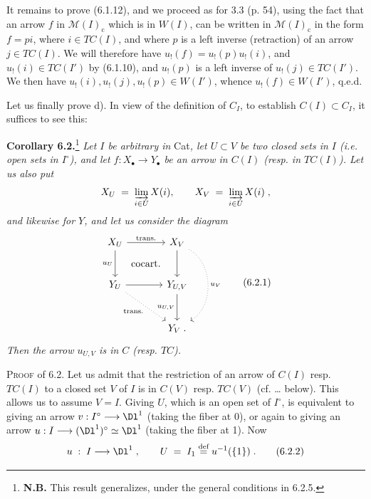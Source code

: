 

It remains to prove (6.1.12), and we proceed as for 3.3 (p. 54), using the fact that an arrow $f$ in $\mathcal{M}(I)_{\mathrm{c}}$ which is in $W(I)$, can be written in $\mathcal{M}(I)_{\mathrm{c}}$ in the form $f = pi$, where $i \in TC(I)$, and where $p$ is a left inverse (retraction) of an arrow $j \in TC(I)$. We will therefore have $u_!(f) = u_!(p)u_!(i)$, and $u_!(i) \in TC(I')$ by (6.1.10), and $u_!(p)$ is a left inverse of $u_!(j) \in TC(I')$. We then have $u_!(i), u_!(j), u_!(p) \in W(I')$, whence $u_!(f) \in W(I')$, q.e.d.

Let us finally prove d). In view of the definition of $C_I$, to establish $C(I) \subset C_I$, it suffices to see this:

\textbf{Corollary 6.2.}\footnote[31]{\textbf{N.B.} This result generalizes, under the general conditions in 6.2.5.} \textit{Let $I$ be arbitrary in} Cat\textit{, let $U \subset V$ be two closed sets in $I$ (i.e. open sets in $I^{\circ}$), and let $f : X_{\bullet} \longrightarrow Y_{\bullet}$ be an arrow in $C(I)$ (resp. in $TC(I)$). Let us also put}
\[
X_U \;=\; \varinjlim_{i\in U} X(i), \qquad X_V \;=\; \varinjlim_{i\in U} X(i)\;, %
\]
\textit{and likewise for $Y$, and let us consider the diagram}
\[
\begin{tikzcd}[row sep=large, column sep=large]
X_U \arrow[r, "\text{trans.}"] \arrow[d, "u_U"'] \arrow[dr, phantom, "\text{cocart.}"] & X_V \arrow[d] \arrow[dd, dotted, bend left=60, "u_V"] \\
Y_U \arrow[r] \arrow[dr, dotted, "\text{trans.}"'] & Y_{U,V} \arrow[d, "u_{U,V}"'] \\
 & Y_V\;.
\end{tikzcd}
\tag*{(6.2.1)}
\]
\textit{Then the arrow $u_{U,V}$ is in $C$ (resp. $TC$).}

\textsc{Proof} of 6.2. Let us admit that the restriction of an arrow of $C(I)$ resp. $TC(I)$ to a closed set $V$ of $I$ is in $C(V)$ resp. $TC(V)$ (cf. \dots{} below). This allows us to assume $V = I$. Giving $U$, which is an open set of $I^{\circ}$, is equivalent to giving an arrow $v : I^{\circ} \longrightarrow \Dl^1$ (taking the fiber at 0), or again to giving an arrow $u : I \longrightarrow (\Dl^1)^{\circ} \simeq \Dl^1$ (taking the fiber at 1). Now %
\[
u \;:\; I \longrightarrow \Dl^1\;, \qquad U \;=\; I_1 \overset{\text{def}}{=} u^{-1}(\{1\})\;.
\tag*{(6.2.2)}
\]

